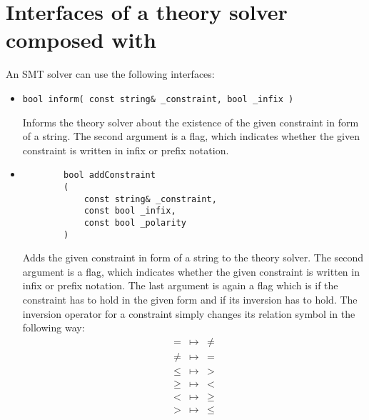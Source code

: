 \section{Interfaces of a theory solver composed with \smtrat}
An SMT solver can use the following interfaces:
\begin{itemize}
	\item \begin{verbatim}bool inform( const string& _constraint, bool _infix )\end{verbatim}
		Informs the theory solver about the existence of the given constraint in form of
		a string. The second argument is a flag, which indicates whether the given constraint
		is written in infix or prefix notation.
	\item \begin{verbatim}
		bool addConstraint
		(
		    const string& _constraint,
		    const bool _infix,
		    const bool _polarity
		)
		\end{verbatim}
		Adds the given constraint in form of a string to the theory solver. The second argument 
		is a flag, which indicates whether the given constraint is written in infix or prefix 
		notation. The last argument is again a flag which is \true if the constraint
		has to hold in the given form and \false if its inversion has to hold. The inversion 
		operator for a constraint simply changes its relation symbol in the following way:
		$$\begin{array}{ccc}
			= & \mapsto & \neq \\
			\neq & \mapsto & = \\
			\leq & \mapsto & > \\
			\geq & \mapsto & < \\
			< & \mapsto & \geq \\
			> & \mapsto & \leq \\
		\end{array}$$\\[2ex]
		

\end{itemize}
